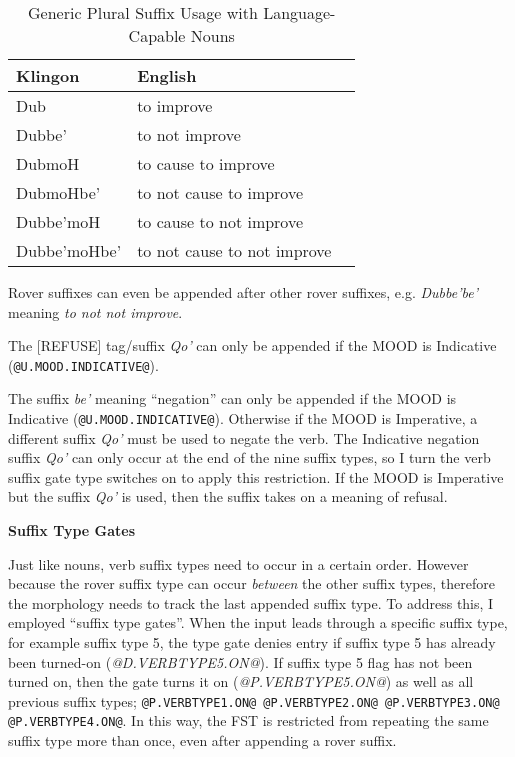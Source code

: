 \documentclass[11pt]{article}
\begin{document}
	\begin{table}[h]
	\begin{center}
	\begin{tabular}{lll}
	\toprule
	\bf Klingon & \bf English \\
	\midrule
	Dub & to improve \\
	Dubbe' & to not improve \\
	DubmoH & to cause to improve \\
	DubmoHbe' & to not cause to improve \\
	Dubbe'moH & to cause to not improve \\
	Dubbe'moHbe' & to not cause to not improve \\
	\bottomrule
	\end{tabular}
	\end{center}
	\caption{Generic Plural Suffix Usage with Language-Capable Nouns}
	\end{table}

Rover suffixes can even be appended after other rover suffixes, e.g. \textit{Dubbe'be'} meaning \textit{to not not improve}.

The [REFUSE] tag/suffix \textit{Qo'} can only be appended if the MOOD is Indicative (\texttt{@U.MOOD.INDICATIVE@}).

The suffix \textit{be'} meaning ``negation'' can only be appended if the MOOD is Indicative (\texttt{@U.MOOD.INDICATIVE@}). Otherwise if the MOOD is Imperative, a different suffix \textit{Qo'} must be used to negate the verb. The Indicative negation suffix \textit{Qo'} can only occur at the end of the nine suffix types, so I turn the verb suffix gate type switches on to apply this restriction. If the MOOD is Imperative but the suffix \textit{Qo'} is used, then the suffix takes on a meaning of refusal.

\textbf{Suffix Type Gates}

Just like nouns, verb suffix types need to occur in a certain order. However because the rover suffix type can occur \textit{between} the other suffix types, therefore the morphology needs to track the last appended suffix type. To address this, I employed ``suffix type gates''. When the input leads through a specific suffix type, for example suffix type 5, the type gate denies entry if suffix type 5 has already been turned-on (\textit{@D.VERBTYPE5.ON@}). If suffix type 5 flag has not been turned on, then the gate turns it on (\textit{@P.VERBTYPE5.ON@}) as well as all previous suffix types; \texttt{@P.VERBTYPE1.ON@ @P.VERBTYPE2.ON@ @P.VERBTYPE3.ON@ @P.VERBTYPE4.ON@}. In this way, the FST is restricted from repeating the same suffix type more than once, even after appending a rover suffix.
\end{document}
